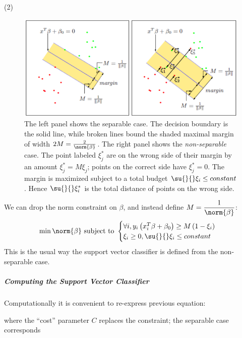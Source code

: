 (2) \\

\begin{figure}[H]
	\begin{center}
		\includegraphics[width=\textwidth]{./chap/1chap/8sec/images/21_svC.PNG}
	\end{center}
	\caption{The left panel shows the separable case. The decision boundary is the solid line,
	while broken lines bound the shaded maximal margin of width $2M=\frac{2}{\norm{\beta}}$.
	The right panel shows the \emph{non-separable} case. The point labeled $\xi_{j}^{*}$ are
	on the wrong side of their margin by an amount $\xi_{j}^{*}=M\xi_{j}$; points on the 
	correct side have $\xi_{j}^{*}=0$. The margin is maximized subject to a total budget
	$\su{}{}\xi_{i}\leq constant$. Hence $\su{}{}\xi_{i}^{*}$ is the total distance of points
	on the wrong side.}
	\label{fig:21_svC}
\end{figure}
We can drop the norm constraint on $\beta$, and instead define $M=\dfrac{1}{\norm{\beta}}$:
$$\min\norm{\beta}\text{ subject to }
\begin{cases}
	\forall i, y_{i}\left(x_{i}^{T}\beta+\beta_{0}\right)\geq M\left(1-\xi_{i}\right)\\
	\xi_{i}\geq 0, \su{}{}\xi_{i}\leq constant
\end{cases}
$$
This is the usual way the support vector classifier is defined from the non-separable case.
\subparagraph{Computing the Support Vector Classifier}
Computationally it is convenient to re-express previous equation:
\begin{center}
\end{center}
where the ``cost'' parameter $C$ replaces the constraint; the separable case corresponds

